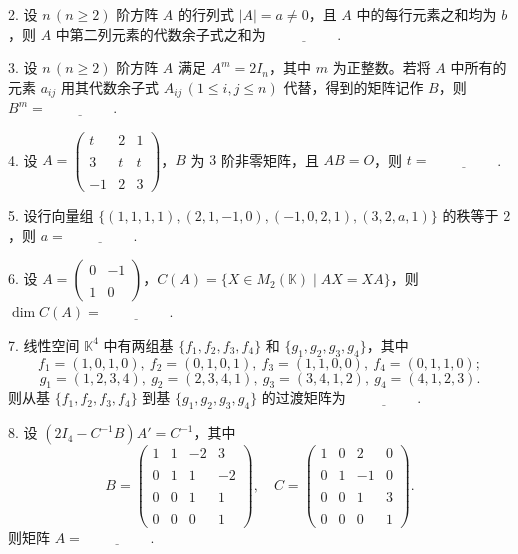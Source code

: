 2. 设 $n\,(n \ge 2)$ 阶方阵 $A$ 的行列式 $|A| = a \neq 0$，且 $A$ 中的每行元素之和均为 $b$，则 $A$ 中第二列元素的代数余子式之和为 $\underline{\hspace{2cm}}$.

3. 设 $n\,(n \ge 2)$ 阶方阵 $A$ 满足 $A^m = 2I_n$，其中 $m$ 为正整数。若将 $A$ 中所有的元素 $a_{ij}$ 用其代数余子式 $A_{ij}\,(1 \le i, j \le n)$ 代替，得到的矩阵记作 $B$，则 $B^m = \underline{\hspace{2cm}}$.

4. 设 $A = \begin{pmatrix} t & 2 & 1 \\ \\ 3 & t & t \\ \\ -1 & 2 & 3 \end{pmatrix}$，$B$ 为 $3$ 阶非零矩阵，且 $AB=O$，则 $t = \underline{\hspace{2cm}}$.

5. 设行向量组 $\{(1,1,1,1), (2,1,-1,0), (-1,0,2,1), (3,2,a,1)\}$ 的秩等于 $2$，则 $a = \underline{\hspace{2cm}}$.

6. 设 $A = \begin{pmatrix} 0 & -1 \\ \\ 1 & 0 \end{pmatrix}$，$C(A) = \{X \in M_2(\mathbb{K}) \mid AX = XA\}$，则 $\dim C(A) = \underline{\hspace{2cm}}$.

7. 线性空间 $\mathbb{K}^4$ 中有两组基 $\{f_1, f_2, f_3, f_4\}$ 和 $\{g_1, g_2, g_3, g_4\}$，其中
   \[f_1 = (1,0,1,0),\ f_2 = (0,1,0,1),\ f_3 = (1,1,0,0),\ f_4 = (0,1,1,0);\]
   \[g_1 = (1,2,3,4),\ g_2 = (2,3,4,1),\ g_3 = (3,4,1,2),\ g_4 = (4,1,2,3).\]
   则从基 $\{f_1, f_2, f_3, f_4\}$ 到基 $\{g_1, g_2, g_3, g_4\}$ 的过渡矩阵为 $\underline{\hspace{2cm}}$.

8. 设 $(2I_4 - C^{-1}B)A' = C^{-1}$，其中
   \[B = \begin{pmatrix} 1 & 1 & -2 & 3 \\ \\ 0 & 1 & 1 & -2 \\ \\ 0 & 0 & 1 & 1 \\ \\ 0 & 0 & 0 & 1 \end{pmatrix}, \quad 
   C = \begin{pmatrix} 1 & 0 & 2 & 0 \\ \\ 0 & 1 & -1 & 0 \\ \\ 0 & 0 & 1 & 3 \\ \\ 0 & 0 & 0 & 1 \end{pmatrix}.\]
   则矩阵 $A = \underline{\hspace{2cm}}$.

